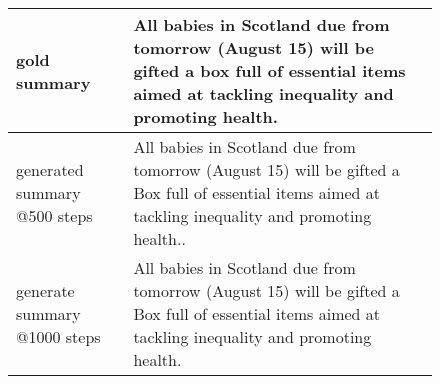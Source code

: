 \documentclass[11pt,a4paper]{article}
\begin{document}
\begin{figure*}[t]
\begin{adjustbox}{width=\textwidth}
\begin{tabular}{|p{}|p{}|}
    \hline
    gold summary & All babies in Scotland due from tomorrow (August 15) will be gifted a box full of essential items aimed at tackling inequality and promoting health. \\
    \hline
    generated summary @500 steps & All babies in Scotland due from tomorrow (August 15) will be gifted a Box full of essential items aimed at tackling inequality and promoting health..\\
    \hline
    generate summary @1000 steps & All babies in Scotland due from tomorrow (August 15) will be gifted a Box full of essential items aimed at tackling inequality and promoting health.\\
    \hline
    \end{tabular}
    \end{adjustbox}

    \end{figure*}
\end{document}
